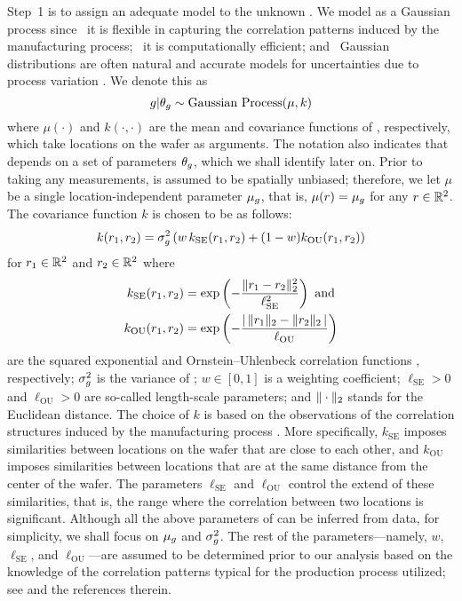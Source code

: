 Step~1 is to assign an adequate model to the unknown \g. We model \g as a
Gaussian process \cite{rasmussen2006} since \one~it is flexible in capturing the
correlation patterns induced by the manufacturing process; \two~it is
computationally efficient; and \three~Gaussian distributions are often natural
and accurate models for uncertainties due to process variation
\cite{srivastava2010, reda2009, juan2012}. We denote this as
\begin{equation} \elab{inference-prior}
  \g | \t_\g \sim \text{Gaussian Process}(\mu, k)
\end{equation}
where $\mu(\cdot)$ and $k(\cdot, \cdot)$ are the mean and covariance functions
of \g, respectively, which take locations on the wafer as arguments. The
notation also indicates that \g depends on a set of parameters $\t_\g$, which we
shall identify later on. Prior to taking any measurements, \g is assumed to be
spatially unbiased; therefore, we let $\mu$ be a single location-independent
parameter $\mu_\g$, that is, $\mu(r) = \mu_\g$ for any $r \in \real^2$. The
covariance function $k$ is chosen to be as follows:
\begin{equation} \elab{inference-covariance}
  k(r_1, r_2) = \sigma_\g^2 \left(w \, k_\text{SE}(r_1, r_2) + (1 - w) k_\text{OU}(r_1, r_2)\right)
\end{equation}
for $r_1 \in \real^2$ and $r_2 \in \real^2$ where
\begin{align*}
  k_\text{SE}(r_1, r_2) & = \exp\left(-\frac{\norm[2]{r_1 - r_2}^2}{\ell_\text{SE}^2}\right) \text{ and} \\
  k_\text{OU}(r_1, r_2) & = \exp\left(-\frac{\absolute{\,\norm[2]{r_1} - \norm[2]{r_2}\,}}{\ell_\text{OU}}\right)
\end{align*}
are the squared exponential and Ornstein--Uhlenbeck correlation functions
\cite{rasmussen2006}, respectively; $\sigma_\g^2$ is the variance of \g; $w \in
[0, 1]$ is a weighting coefficient; $\ell_\text{SE} > 0$ and $\ell_\text{OU} >
0$ are so-called length-scale parameters; and $\norm[2]{\cdot}$ stands for the
Euclidean distance. The choice of $k$ is based on the observations of the
correlation structures induced by the manufacturing process
\cite{chandrakasan2000, cheng2011}. More specifically, $k_\text{SE}$ imposes
similarities between locations on the wafer that are close to each other, and
$k_\text{OU}$ imposes similarities between locations that are at the same
distance from the center of the wafer. The parameters $\ell_\text{SE}$ and
$\ell_\text{OU}$ control the extend of these similarities, that is, the range
where the correlation between two locations is significant. Although all the
above parameters of \g can be inferred from data, for simplicity, we shall focus
on $\mu_\g$ and $\sigma_\g^2$. The rest of the parameters---namely, $w$,
$\ell_\text{SE}$, and $\ell_\text{OU}$---are assumed to be determined prior to
our analysis based on the knowledge of the correlation patterns typical for the
production process utilized; see \cite{marzouk2009} and the references therein.

